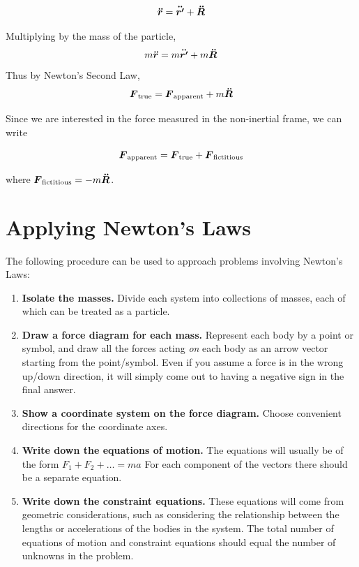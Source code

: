 \documentclass[openany,oneside]{book}
\begin{document}
\[
    \lvect{\ddot{r}} = \lvect{\ddot{r'}} + \vect{\ddot{R}}
\]

Multiplying by the mass of the particle, 
\[
    m\lvect{\ddot{r}} = m\lvect{\ddot{r'}} + m\vect{\ddot{R}} \\
\]
Thus by Newton's Second Law, 
\[    
    \vect{F}_\text{true} = \vect{F}_\text{apparent} + m\vect{\ddot{R}} 
\]

Since we are interested in the force measured in the non-inertial frame, we can write


\[    
    \vect{F}_\text{apparent} = \vect{F}_\text{true} + \vect{F}_\text{fictitious} 
\]

where $\vect{F}_\text{fictitious} = -m\vect{\ddot{R}}$.

\section{Applying Newton's Laws}

The following procedure can be used to approach problems involving Newton's Laws: 

\begin{enumerate}
    \item \textbf{Isolate the masses. } Divide each system into collections of masses, each of which can be 
        treated as a particle. 
    \item \textbf{Draw a force diagram for each mass. } Represent each body by a point or symbol, and draw all the forces
        acting \textit{on} each body as an arrow vector starting from the point/symbol. Even if you assume a force is in the wrong up/down 
        direction, it will simply come out to having a negative sign in the final answer.
    \item \textbf{Show a coordinate system on the force diagram. } Choose convenient directions for the coordinate axes. 
    \item \textbf{Write down the equations of motion. } The equations will usually be of the form $F_1 + F_2 + \dots = ma$ For each component of the vectors there should be a separate equation.
    \item \textbf{Write down the constraint equations. } These equations will come from geometric considerations, such as considering the relationship between the lengths or accelerations
        of the bodies in the system. The total number of equations of motion and constraint equations should equal the number of unknowns in the problem. 
\end{enumerate}
\end{document}
